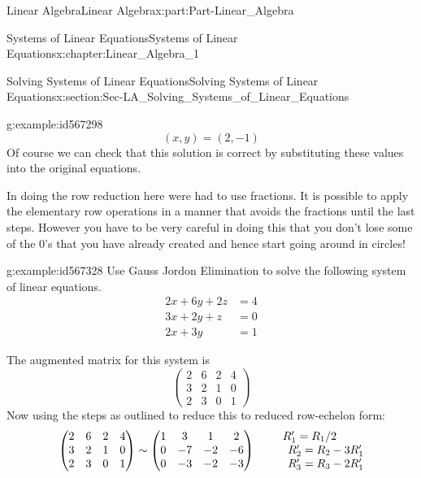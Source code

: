 \documentclass[oneside,10pt,]{book}
\numberwithin{equation}{section}
\newcommand{\amp}{&}
\begin{document}
\begin{partptx}{Linear Algebra}{}{Linear Algebra}{}{}{x:part:Part-Linear_Algebra}
\begin{chapterptx}{Systems of Linear Equations}{}{Systems of Linear Equations}{}{}{x:chapter:Linear_Algebra_1}
\begin{sectionptx}{Solving Systems of Linear Equations}{}{Solving Systems of Linear Equations}{}{}{x:section:Sec-LA_Solving_Systems_of_Linear_Equations}
\begin{example}{}{g:example:id567298}
\begin{equation*}
(x,y)=(2,-1)
\end{equation*}
Of course we can check that this solution is correct by substituting these values into the original equations.%
\par
In doing the row reduction here were had to use fractions. It is possible to apply the elementary row operations in a manner that avoids the fractions until the last steps. However you have to be very careful in doing this that you don’t lose some of the \(0\)’s that you have already created and hence start going around in circles!%
\end{example}
\begin{example}{}{g:example:id567328}%
Use Gauss Jordon Elimination to solve the following system of linear equations.%
\begin{align*}
2x+6y+2z \amp = 4\\
3x+2y+z \amp = 0\\
2x+3y \amp = 1
\end{align*}
%
\par\smallskip%
\noindent\hypertarget{g:solution:id567303}{}The augmented matrix for this system is%
\begin{equation*}
\begin{pmatrix} 2 \amp 6 \amp 2 \amp 4 \\ 3 \amp 2 \amp 1 \amp 0 \\ 2 \amp 3 \amp 0 \amp 1 \end{pmatrix} 
\end{equation*}
Now using the steps as outlined to reduce this to reduced row-echelon form:%
\begin{align*}
\begin{pmatrix} 2 \amp 6 \amp 2 \amp 4 \\ 3 \amp 2 \amp 1 \amp 0 \\ 2 \amp 3 \amp 0 \amp 1 \end{pmatrix} \amp \sim \begin{pmatrix} 1 \amp 3 \amp 1 \amp 2 \\ 0 \amp -7 \amp -2 \amp -6 \\ 0 \amp -3 \amp -2 \amp -3 \end{pmatrix}  \begin{matrix} R_1'=R_1/2 \\ \hspace{10mm} R_2'=R_2-3R_1' \\ \hspace{10mm} R_3'=R_3-2R_1' \end{matrix} \\

\end{align*}
\end{example}
\end{sectionptx}
\end{chapterptx}
\end{partptx}
\end{document}
